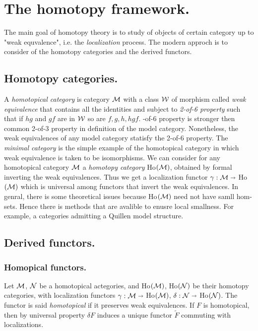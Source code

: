 	

\section{The homotopy framework.}
The main goal of homotopy theory is to study of objects of certain category up to "weak equvalence", i.e. the \textit{localization} process. The modern approch is to consider of the homotopy categories and the derived functors.
	\subsection{Homotopy categories.}
	A \textit{homotopical category} is category $\mathcal{M}$ with a class $\mathcal{W}$ of morphism called \textit{weak equivalence} that contains all the identities and subject to \textit{2-of-6 property} such that if $ hg $ and $ gf $ are in $\mathcal{W}$ so are 
	$ f, g, h, hgf $.
	\newline
	-of-6 property is stronger then common 2-of-3 property in definition of the model category. Nonetheless, the weak
	equivalences of any model category statisfy the 2-of-6 property. The \textit{minimal category} is the simple example of the homotopical category in which weak equivalence is taken to be isomorphisms. We can consider for any homotopical category $\mathcal{M}$
	a \textit{homotopy category} Ho$ (\mathcal{M}) $, obtained by formal inverting the weak equivalences. Thus we get a localization
	functor $ \gamma : \mathcal{M} \shortrightarrow $ Ho$ (\mathcal{M}) $ which is universal among functors that invert the weak equivalences. In genral,
	there is some theoretical issues because Ho$(\mathcal{M})$ need not have samll hom-sets. Hence there is methods that are avalible 
	to enusre local smallness. For example, a categories admitting a Quillen model structure.
	
	\subsection{Derived functors.} 
		\subsubsection{Homopical functors.}
		Let $\mathcal{M}$, $\mathcal{N}$ be a homotopical actegories, and Ho$(\mathcal{M})$, Ho$(\mathcal{N})$ be their homotopy categories, with localization functors $\gamma : \mathcal{M} \shortrightarrow$ Ho$(\mathcal{M})$, $\delta : \mathcal{N} \shortrightarrow$ Ho$(\mathcal{N})$. The functor is said \textit{homotopical} if it preserves weak equivalences. If $F$ is homotopical, then by universal property $\delta F $ 
		induces a unique functor $ \tilde{F} $ commuting with localizations. %
